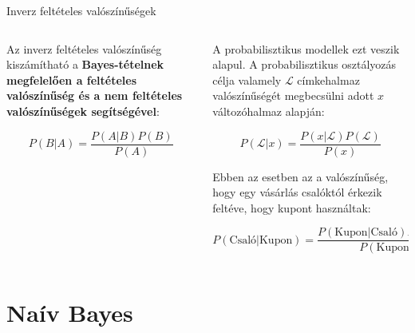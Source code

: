 \documentclass[english, aspectratio=169]{beamer}
\makeatletter
\let\origtableofcontents=\tableofcontents
\def\tableofcontents{\@ifnextchar[{\origtableofcontents}{\gobbletableofcontents}}
\def\gobbletableofcontents#1{\origtableofcontents}
\makeatother
\begin{document}
\begin{frame}{Inverz feltételes valószínűségek}
\begin{columns}
\begin{column}{.4\textwidth}
Az inverz feltételes valószínűség kiszámítható a \textbf{Bayes-tételnek megfelelően a feltételes valószínűség és a nem feltételes valószínűségek segítségével}:
\begin{block}{}
\vspace{-.3cm}
\[
P\left( B \vert A \right) = \frac{P\left( A \vert B \right) P\left( B \right)}{P\left( A \right)}
\]
\end{block}
\end{column}
\begin{column}{.6\textwidth}
A probabilisztikus modellek ezt veszik alapul. A probabilisztikus osztályozás célja valamely $\mathcal{L}$ címkehalmaz valószínűségét megbecsülni adott $x$ változóhalmaz alapján:
\begin{block}{}
\[
P\left( \mathcal{L} \vert x \right) = \frac{P\left( x \vert \mathcal{L} \right)P\left( \mathcal{L} \right)}{P\left( x \right)}
\]
\end{block}
Ebben az esetben az a valószínűség, hogy egy vásárlás csalóktól érkezik feltéve, hogy kupont használtak:
\begin{block}{}
\vspace{-.3cm}
\[
P\left( \text{Csaló} \vert \text{Kupon} \right) = \frac{P\left( \text{Kupon} \vert \text{Csaló} \right)P\left( \text{Csaló} \right)}{P\left( \text{Kupon} \right)}
\]
\end{block}
\end{column}
\end{columns}
\end{frame}

\section{Naív Bayes}

\begin{frame}
\tableofcontents[currentsection]
\end{frame}
\end{document}
